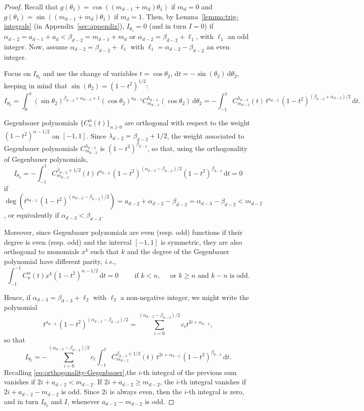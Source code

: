 \documentclass[a4paper]{article}
\theoremstyle{plain}
\theoremstyle{definition}
\newcommand{\dr}{\mathrm{d}}
\begin{document}
\begin{proof}
        Recall that $g(\theta_1)=\cos((m_{d-1}+m_d)\theta_1)$ if $m_d=0$ and $g(\theta_1)=\sin((m_{d-1}+m_d)\theta_1)$ if $m_d=1$. Then, by Lemma~\ref{lemma:trig-integrals} (in Appendix~\ref{sec:appendix}), $I_{\theta_1}=0$ (and in turn $I=0$) if $\alpha_{d-2}=a_{d-1}+a_d<\beta_{d-2}=m_{d-1}+m_d$ or $\alpha_{d-2}=\beta_{d-2}+\ell_1$, with $\ell_1$ an odd integer. Now, assume $\alpha_{d-2}=\beta_{d-2}+\ell_1$ with $\ell_1=\alpha_{d-2}-\beta_{d-2}$ an even integer.

        Focus on $I_{\theta_2}$ and use the change of variables $t=\cos\theta_2$, $\dr t = -\sin(\theta_2)\,\dr\theta_2$, keeping in mind that $\sin(\theta_2)=(1-t^2)^{1/2}$:
        $$
        I_{\theta_2}=\int_{0}^\pi (\sin\theta_2)^{\beta_{d-2}+\alpha_{d-2}+1}(\cos\theta_2)^{a_{d-2}}C_{m_{d-2}}^{\lambda_{d-2}}(\cos\theta_2)\,\dr \theta_{2} = -\int_{-1}^1 C_{m_{d-2}}^{\lambda_{d-2}}(t)\,t^{a_{d-2}}\,(1-t^2)^{(\beta_{d-2}+\alpha_{d-2})/2}\,\dr t.
        $$
        
        Gegenbauer polynomials $\{C_n^\alpha(t)\}_{n\geq 0}$ are orthogonal with respect to the weight $(1-t^2)^{\alpha-1/2}$ on $[-1,1]$. Since $\lambda_{d-2}=\beta_{d-2}+1/2$, the weight associated to Gegenbauer polynomials $C_{m_{d-2}}^{\lambda_{d-2}}$ is $(1-t^2)^{\beta_{d-2}}$, so that, using the orthogonality of Gegenbauer polynomials,
        $$
        I_{\theta_2}= -\int_{-1}^1 C_{m_{d-2}}^{\beta_{d-2}+1/2}(t)\,t^{a_{d-2}}\,(1-t^2)^{(\alpha_{d-2}-\beta_{d-2})/2}(1-t^2)^{\beta_{d-2}}\,\dr t =0
        $$
        if $\deg(t^{a_{d-2}}\,(1-t^2)^{(\alpha_{d-2}-\beta_{d-2})/2})=a_{d-2}+\alpha_{d-2}-\beta_{d-2}=\alpha_{d-3}-\beta_{d-2}<m_{d-2}$, or equivalently if $\alpha_{d-3}<\beta_{d-3}$.

        Moreover, since Gegenbauer polynomials are even (resp. odd) functions if their degree is even (resp. odd) and the interval $[-1,1]$ is symmetric, they are also orthogonal to monomials $x^k$ such that $k$ and the degree of the Gegenbauer polynomial have different parity, \textit{i.e.},
        \begin{equation}
            \label{eq:orthogonality-Gegenbauer}
            \int_{-1}^{-1} C_n^{\alpha}(t) x^k (1-t^2)^{\alpha-1/2}\,\dr t = 0 \qquad\text{ if } k<n,\quad \text{ or } k\geq n\text{ and }k-n\text{ is odd}. 
        \end{equation}
        
        Hence, if $\alpha_{d-3}=\beta_{d-3}+\ell_2$ with $\ell_2$ a non-negative integer, we might write the polynomial 
        $$t^{a_{d-2}}\,(1-t^2)^{(\alpha_{d-2}-\beta_{d-2})/2}=\sum_{i=0}^{(\alpha_{d-2}-\beta_{d-2})/2}c_i t^{2i+\alpha_{d-2}},$$
        so that
        $$
        I_{\theta_2}= -\sum_{i=0}^{(\alpha_{d-2}-\beta_{d-2})/2}c_i \int_{-1}^1 C_{m_{d-2}}^{\beta_{d-2}+1/2}(t)\, t^{2i+\alpha_{d-2}}\,    (1-t^2)^{\beta_{d-2}}\,\dr t.
        $$
        Recalling \eqref{eq:orthogonality-Gegenbauer},the $i$-th integral of the previous sum vanishes if $2i+a_{d-2}<m_{d-2}$. If $2i+a_{d-2}\geq m_{d-2}$, the $i$-th integral vanishes if $2i+a_{d-2}-m_{d-2}$ is odd. Since $2i$ is always even, then the $i$-th integral is zero, and in turn $I_{\theta_2}$ and $I$, whenever $a_{d-2}-m_{d-2}$ is odd. 


\end{proof}
\end{document}
